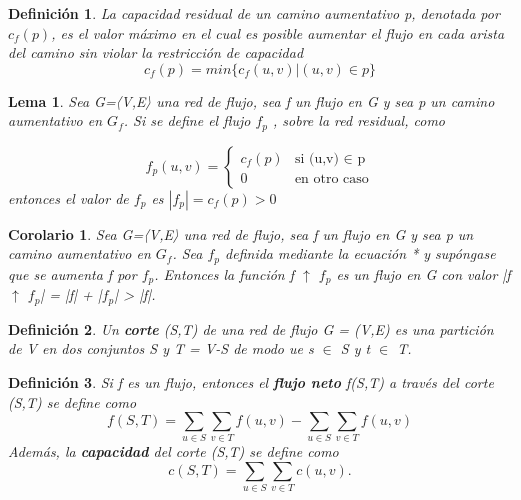\documentclass[10pt]{article} %
\newtheorem{mydef}{Definici\'on}%
\newtheorem{lem}{Lema}
\newtheorem{col}{Corolario}
\begin{document}
	\begin{mydef}\label{capacidad_residual_c_a}
		La capacidad residual de un camino aumentativo p, denotada por $c_f(p)$, es el valor máximo en el cual es posible aumentar el flujo en cada arista del camino sin violar la restricción de capacidad
		\begin{equation}
			c_f(p) = min\{c_f(u,v) | (u,v) \in p \}
		\end{equation}
	\end{mydef}

	\begin{lem}\label{flujo_red_r}
		Sea G=〈V,E〉 una red de flujo, sea f un flujo en G y sea p un camino aumentativo en $G_f$. Si se define el flujo $f_p$ , sobre la red residual, como
		
		\begin{equation}
			f_p(u,v) = \left\{
			\begin{array}{lr}
				c_f(p) & \text{si (u,v) $\in$ p}\\
				0 & \text{en otro caso}
			\end{array}
			\right.
		\end{equation}
		entonces el valor de $f_p$ es $|f_p|=c_f(p)>0$	
		
	\end{lem}

	\begin{col}
		Sea G=〈V,E〉 una red de flujo, sea f un flujo en G y sea p un camino aumentativo en $G_f$. Sea $f_p$ definida mediante la ecuación * y supóngase que se aumenta f por $f_p$. Entonces la función f $\uparrow$ $f_p$ es un flujo en G con valor |f $\uparrow$ $f_p$| = |f| + |$f_p$| > |f|.
	\end{col}

	\begin{mydef}\label{corte}
		Un \textbf{corte} (S,T) de una red de flujo G = (V,E) es una partici\'on de V en dos conjuntos S y T = V-S de modo 	ue s $\in$ S y t $\in$ T.
	\end{mydef}

	\begin{mydef}\label{flujo_corte}
		Si f es un flujo, entonces el \textbf{flujo neto} f(S,T) a trav\'es del corte (S,T) se define como
		\begin{equation}
			f(S,T) = \sum_{u\in S} \sum_{v\in T} f(u,v) - \sum_{u \in S}\sum_{v \in T} f(u,v)
		\end{equation}
	Adem\'as, la \textbf{capacidad} del corte (S,T) se define como
	\begin{equation}
		c(S,T) = \sum_{u \in S}\sum_{v \in T}c(u,v).
	\end{equation} 
	\end{mydef}
\end{document}
